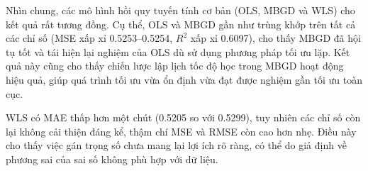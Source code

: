 Nhìn chung, các mô hình hồi quy tuyến tính cơ bản (OLS, MBGD và WLS) cho kết
quả rất tương đồng. Cụ thể, OLS và MBGD gần như trùng khớp trên tất cả các chỉ
số (MSE xấp xỉ 0.5253--0.5254, $R^2$ xấp xỉ 0.6097), cho thấy MBGD đã hội
tụ tốt và tái hiện lại nghiệm của OLS dù sử dụng phương pháp tối ưu lặp. Kết
quả này cũng cho thấy chiến lược lập lịch tốc độ học trong MBGD hoạt động hiệu
quả, giúp quá trình tối ưu vừa ổn định vừa đạt được nghiệm gần tối ưu toàn cục.

WLS có MAE thấp hơn một chút (0.5205 so với 0.5299), tuy nhiên các chỉ số còn
lại không cải thiện đáng kể, thậm chí MSE và RMSE còn cao hơn nhẹ. Điều này cho
thấy việc gán trọng số chưa mang lại lợi ích rõ ràng, có thể do giả định về
phương sai của sai số không phù hợp với dữ liệu.
